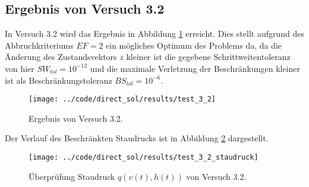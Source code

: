 \subsection{Ergebnis von Versuch 3.2}\label{kap:Versuch32}
In Versuch 3.2 wird das Ergebnis in Abbildung \ref{img:test_3_2} erreicht. Dies stellt aufgrund des Abbruchkriteriums $EF = 2$ ein mögliches Optimum des Problems da, da die Änderung des Zustandsvektors $z$ kleiner ist die gegebene Schrittweitentoleranz von hier $SW_{tol} = 10^{-12}$ und die maximale Verletzung der Beschränkungen kleiner ist als Beschränkungstoleranz $BS_{tol} = 10^{-6}$.
\begin{figure}[H]
\begin{center}
\texttt{[image: ../code/direct\_sol/results/test\_3\_2]}
\caption{Ergebnis von Versuch 3.2.}\label{img:test_3_2}
\end{center}
\end{figure}
Der Verlauf des Beschränkten Staudrucks ist in Abbildung \ref{img:test_3_2_staudruck} dargestellt.
\begin{figure}[H]
\begin{center}
\texttt{[image: ../code/direct\_sol/results/test\_3\_2\_staudruck]}
\caption{Überprüfung Staudruck $q(v(t),h(t))$ von Versuch 3.2.}\label{img:test_3_2_staudruck}
\end{center}
\end{figure}












\newpage
